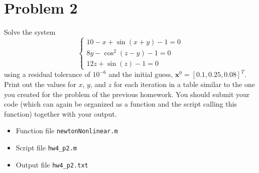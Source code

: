 \section{Problem 2}%
\label{sec:problem_2}
Solve the system
\begin{equation*}
  \begin{cases}
    10 - x + \sin(x + y) - 1 = 0 \\
    8 y - \cos^{2}(z - y) - 1 = 0 \\
    12 z + \sin(z) - 1 = 0
  \end{cases}
\end{equation*}
using a residual tolerance of $10^{-6}$ and the initial guess, $\mathbf{x}^{0} = [0.1, 0.25, 0.08]^{T}$. Print out the values for $x$, $y$, and $z$ for each iteration in a table similar to  the one you created for the problem of the previous  homework. You should submit your code (which can again be organized as a function and the script calling this function) together with your output.
\begin{solution}
  \quad
  \begin{itemize}
    \item
      Function file \verb|newtonNonlinear.m|
      
    \item
      Script file \verb|hw4_p2.m|
      
    \item
      Output file \verb|hw4_p2.txt|
      
  \end{itemize}
\end{solution}

